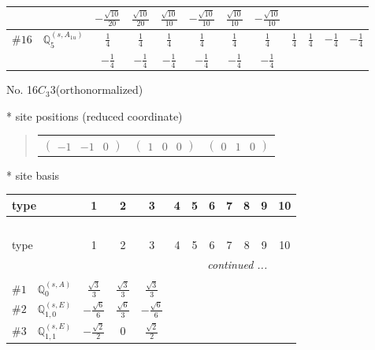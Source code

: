 \documentclass[fleqn,9pt,landscape]{jsarticle}
\begin{document}
\begin{center}
\begin{longtable}{lcccccccccc}
& $ - \frac{\sqrt{10}}{20} $ & $ \frac{\sqrt{10}}{20} $ & $ \frac{\sqrt{10}}{10} $ & $ - \frac{\sqrt{10}}{10} $ & $ \frac{\sqrt{10}}{10} $ & $ - \frac{\sqrt{10}}{10} $ & $  $ & $  $ & $  $ & $  $ \\ \hline
$ \#16\quad \mathbb{Q}_{5}^{(s,A_{1u})} $ & $ \frac{1}{4} $ & $ \frac{1}{4} $ & $ \frac{1}{4} $ & $ \frac{1}{4} $ & $ \frac{1}{4} $ & $ \frac{1}{4} $ & $ \frac{1}{4} $ & $ \frac{1}{4} $ & $ - \frac{1}{4} $ & $ - \frac{1}{4} $ \\
& $ - \frac{1}{4} $ & $ - \frac{1}{4} $ & $ - \frac{1}{4} $ & $ - \frac{1}{4} $ & $ - \frac{1}{4} $ & $ - \frac{1}{4} $ & $  $ & $  $ & $  $ & $  $ \\
\end{longtable}
\end{center}
\newpage
\begin{center}
\LARGE
No. 16\quad$C_{3}$\quad$3$\quad[ trigonal ] (orthonormalized)
\end{center}
\vspace{5mm}
* site positions (reduced coordinate)
\begin{quote}
\begin{tabular}{ccc}
$ \begin{pmatrix} -1 & -1 & 0 \end{pmatrix} $ & $ \begin{pmatrix} 1 & 0 & 0 \end{pmatrix} $ & $ \begin{pmatrix} 0 & 1 & 0 \end{pmatrix} $
\end{tabular}
\end{quote}
* site basis
\begin{center}
\renewcommand{\arraystretch}{1.3}
\begin{longtable}{lcccccccccc}
 \hline \hline
type & 1 & 2 & 3 & 4 & 5 & 6 & 7 & 8 & 9 & 10 \\ \hline \endfirsthead

\multicolumn{10}{l}{\tablename\ \thetable{}} \\
 \hline \hline
type & 1 & 2 & 3 & 4 & 5 & 6 & 7 & 8 & 9 & 10 \\ \hline \endhead

 \hline \hline
\multicolumn{10}{r}{\footnotesize\it continued ...} \\ \endfoot

 \hline \hline
\multicolumn{10}{r}{} \\ \endlastfoot

$ \#1\quad \mathbb{Q}_{0}^{(s,A)} $ & $ \frac{\sqrt{3}}{3} $ & $ \frac{\sqrt{3}}{3} $ & $ \frac{\sqrt{3}}{3} $ \\ \hline
$ \#2\quad \mathbb{Q}_{1,0}^{(s,E)} $ & $ - \frac{\sqrt{6}}{6} $ & $ \frac{\sqrt{6}}{3} $ & $ - \frac{\sqrt{6}}{6} $ \\ \hline
$ \#3\quad \mathbb{Q}_{1,1}^{(s,E)} $ & $ - \frac{\sqrt{2}}{2} $ & $ 0 $ & $ \frac{\sqrt{2}}{2} $ \\
\end{longtable}
\end{center}
\end{document}
